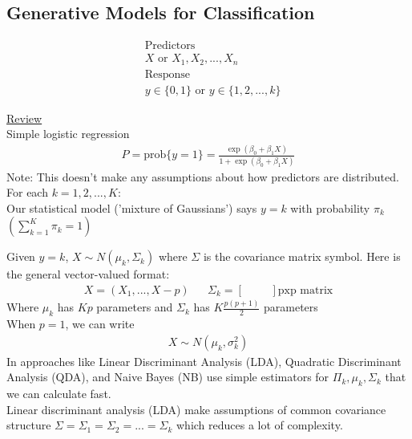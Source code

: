 \documentclass[12pt, letterpaper]{article}
\begin{document}
\subsection{Generative Models for Classification}
\begin{align*}
    &\text{Predictors} \\
    &X \text{ or } X_1,X_2,...,X_n \\
    &\text{Response} \\ 
    &y \in \{0,1\} \text{ or } y \in \{1,2,...,k\} 
\end{align*}

\noindent \underline{Review} \\
Simple logistic regression
\begin{align*}
    P = \text{prob}\{y=1\} = \frac{\exp(\beta_0+\beta_1X)}{1+\exp(\beta_0+\beta_1X)}
\end{align*}
Note: This doesn't make any assumptions about how predictors are distributed. \\ 

\noindent For each $k = 1,2,...,K$: \\
Our statistical model ('mixture of Gaussians') says $y=k$ with probability $\pi_k$ $(\sum_{k=1}^{K}\pi_k = 1)$

\noindent Given $y=k$, $X \sim N(\mu_k, \Sigma_k)$ where $\Sigma$ is the covariance matrix symbol. Here is the general vector-valued format: 
\begin{align*}
    X = (X_1,...,X-p) & & \Sigma_k = \begin{bmatrix}
    & &\\
    & &
    \end{bmatrix} \text{pxp matrix}
\end{align*}
Where $\mu_k$ has $Kp$ parameters and $\Sigma_k$ has $K\frac{p(p+1)}{2}$ parameters \\
\noindent When $p=1$, we can write 
\begin{align*}
    X\sim N (\mu_k, \sigma^2_k)
\end{align*}
In approaches like Linear Discriminant Analysis (LDA), Quadratic Discriminant
Analysis (QDA), and Naive Bayes (NB) use simple estimators for $\Pi_k, \mu_k, \Sigma_k$
that we can calculate fast. \\

\noindent {} Linear discriminant analysis (LDA) make assumptions of common covariance structure
$\Sigma = \Sigma_1 = \Sigma_2 = ... = \Sigma_k$ which reduces a lot of complexity.
\end{document}
